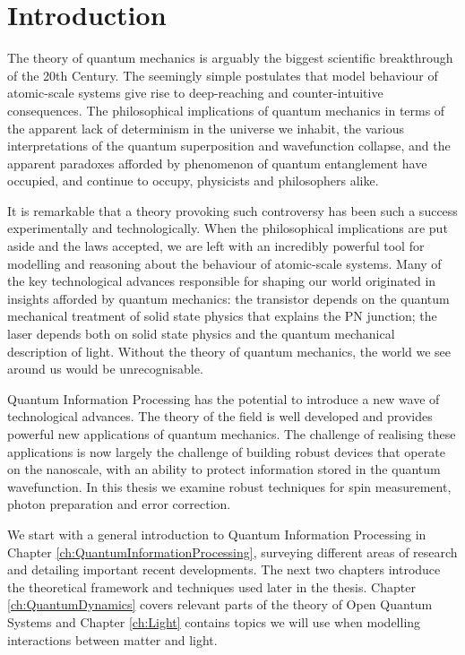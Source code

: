 \chapter{Introduction} 
\label{ch:Motivation}

The theory of quantum mechanics is arguably the biggest scientific breakthrough of the 20th Century. The seemingly simple postulates that model behaviour of atomic-scale systems give rise to deep-reaching and counter-intuitive consequences. The philosophical implications of quantum mechanics in terms of the apparent lack of determinism in the universe we inhabit, the various interpretations of the quantum superposition and wavefunction collapse, and the apparent paradoxes afforded by phenomenon of quantum entanglement have occupied, and continue to occupy, physicists and philosophers alike.

It is remarkable that a theory provoking such controversy has been such a success experimentally and technologically. When the philosophical implications are put aside and the laws accepted, we are left with an incredibly powerful tool for modelling and reasoning about the behaviour of atomic-scale systems. Many of the key technological advances responsible for shaping our world originated in insights afforded by quantum mechanics: the transistor depends on the quantum mechanical treatment of solid state physics that explains the PN junction; the laser depends both on solid state physics and the quantum mechanical description of light. Without the theory of quantum mechanics, the world we see around us would be unrecognisable.

Quantum Information Processing has the potential to introduce a new wave of technological advances. The theory of the field is well developed and provides  powerful new applications of quantum mechanics. The challenge of realising these applications is now largely the challenge of building robust devices that operate on the nanoscale, with an ability to protect information stored in the quantum wavefunction. In this thesis we examine robust techniques for spin measurement, photon preparation and error correction.

We start with a general introduction to Quantum Information Processing in Chapter \ref{ch:QuantumInformationProcessing}, surveying different areas of research and detailing important recent developments. The next two chapters introduce the theoretical framework and techniques used later in the thesis. Chapter \ref{ch:QuantumDynamics} covers relevant parts of the theory of Open Quantum Systems and Chapter \ref{ch:Light} contains topics we will use when modelling interactions between matter and light.

